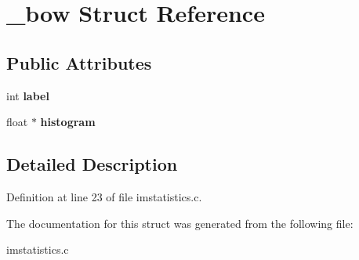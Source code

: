 \hypertarget{struct__bow}{
\section{\_\-bow Struct Reference}
\label{struct__bow}
}
\subsection*{Public Attributes}
\begin{DoxyCompactItemize}
\item 
\hypertarget{struct__bow_a5ca4ea265ab1ad5d5f4b754b413f1225}{
int {\bfseries label}}
\label{struct__bow_a5ca4ea265ab1ad5d5f4b754b413f1225}

\item 
\hypertarget{struct__bow_aa4a9d6028487dfd727b747c60877a809}{
float $\ast$ {\bfseries histogram}}
\label{struct__bow_aa4a9d6028487dfd727b747c60877a809}

\end{DoxyCompactItemize}


\subsection{Detailed Description}


Definition at line 23 of file imstatistics.c.



The documentation for this struct was generated from the following file:\begin{DoxyCompactItemize}
\item 
imstatistics.c\end{DoxyCompactItemize}
